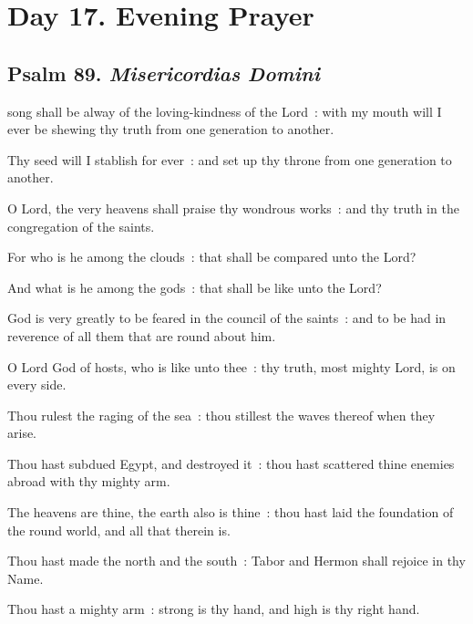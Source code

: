 \section*{Day 17. Evening Prayer}

\subsection{Psalm 89. \textit{Misericordias Domini}}

 song shall be alway of the loving-kindness of the Lord~: with my mouth will I ever be shewing thy truth from one generation to another.\par
{}
Thy seed will I stablish for ever~: and set up thy throne from one generation to another.\par
{}O Lord, the very heavens shall praise thy wondrous works~: and thy truth in the congregation of the saints.\par
{}For who is he among the clouds~: that shall be compared unto the Lord?\par
{}And what is he among the gods~: that shall be like unto the Lord?\par
{}God is very greatly to be feared in the council of the saints~: and to be had in reverence of all them that are round about him.\par
{}O Lord God of hosts, who is like unto thee~: thy truth, most mighty Lord, is on every side.\par
{}Thou rulest the raging of the sea~: thou stillest the waves thereof when they arise.\par
{}Thou hast subdued Egypt, and destroyed it~: thou hast scattered thine enemies abroad with thy mighty arm.\par
{}The heavens are thine, the earth also is thine~: thou hast laid the foundation of the round world, and all that therein is.\par
{}Thou hast made the north and the south~: Tabor and Hermon shall rejoice in thy Name.\par
{}Thou hast a mighty arm~: strong is thy hand, and high is thy right hand.\par
